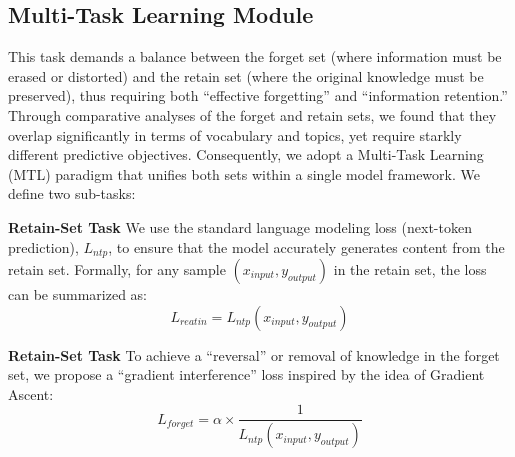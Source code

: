 \documentclass[11pt]{article}
\begin{document}
\subsection{Multi-Task Learning Module}

This task demands a balance between the forget set (where information must be erased or distorted) and the retain set (where the original knowledge must be preserved), thus requiring both “effective forgetting” and “information retention.” 
Through comparative analyses of the forget and retain sets, we found that they overlap significantly in terms of vocabulary and topics, yet require starkly different predictive objectives. 
Consequently, we adopt a Multi-Task Learning (MTL) paradigm that unifies both sets within a single model framework. We define two sub-tasks:


\noindent\textbf{Retain-Set Task}  We use the standard language modeling loss (next-token prediction), $L_{ntp}$, to ensure that the model accurately generates content from the retain set. Formally, for any sample $(x_{input},y_{output})$ in the retain set, the loss can be summarized as:
\begin{equation}
L_{reatin}=L_{ntp}(x_{input},y_{output})
\end{equation}

\noindent\textbf{Retain-Set Task} 
To achieve a “reversal” or removal of knowledge in the forget set, we propose a “gradient interference” loss inspired by the idea of Gradient Ascent:
\begin{equation}
L_{forget}=\alpha  \times  \frac{1}{L_{ntp}(x_{input},y_{output})}
\end{equation}
\end{document}
